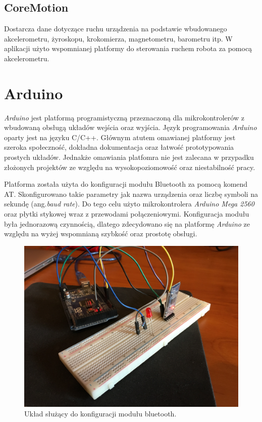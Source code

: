 \subsection{CoreMotion}
Dostarcza dane dotyczące ruchu urządzenia na podstawie wbudowanego akcelerometru, żyroskopu, krokomierza, magnetometru, barometru itp. W aplikacji użyto wspomnianej platformy do sterowania ruchem robota za pomocą akcelerometru.

\section{Arduino}
\textit{Arduino} jest platformą programistyczną przeznaczoną dla mikrokontrolerów z wbudowaną obsługą układów wejścia oraz wyjścia. Język programowania \textit{Arduino} oparty jest na języku C/C++. Głównym atutem omawianej platformy jest szeroka społeczność, dokładna dokumentacja oraz łatwość prototypowania prostych układów. Jednakże omawiania platfomra nie jest zalecana w przypadku złożonych projektów ze względu na wysokopoziomowość oraz niestabilność pracy.

Platforma została użyta do konfiguracji modułu Bluetooth za pomocą komend AT. Skonfigurowano takie parametry jak nazwa urządzenia oraz liczbę symboli na sekundę (ang.\textit{baud rate}). Do tego celu użyto mikrokontrolera \textit{Arduino Mega 2560} oraz płytki stykowej wraz z przewodami połączeniowymi. Konfiguracja modułu była jednorazową czynnością, dlatego zdecydowano się na platformę \textit{Arduino} ze względu na wyżej wspomnianą szybkość oraz prostotę obsługi.
  

\begin{figure}[H]
	\centering
		\includegraphics[width=0.75\linewidth]{pic02/arduino.JPG}
	\caption{Układ służący do konfiguracji modułu bluetooth.}
	\label{fig:arduino}	
\end{figure}

